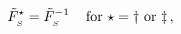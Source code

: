 \begin{equation}\label{boro332'}
\tilde{F}_{_{S}}^{\star}=\tilde{F}_{_{S}}^{-1}\,\quad {\rm
for}\,\, \star=\dag\,\,{\rm or}\,\,\ddag\,,
\end{equation}

